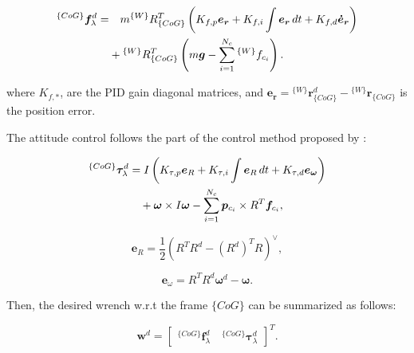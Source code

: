 \begin{align}
  {}^{\{CoG\}} \bm{f}_{\lambda}^{d} = 
  & \quad m {^{\{W\}}R_{\{CoG\}}^{T}} 
  \left( K_{f,p} \bm{e_r} + K_{f,i} \int \bm{e_r} \, dt + K_{f,d} \bm{\dot{e}_r} \right) \notag \\
  & + {^{\{W\}}R_{\{CoG\}}^{T}} 
  \left( m\bm{g} - \sum_{i=1}^{N_c} {^{\{W\}} f_{c_i}} \right).
  \end{align}

where $K_{f,*}$, are the PID gain diagonal matrices, and $\bm{e_r} = {}^{\{W\}}\bm{r}_{\{CoG\}}^{d} - {}^{\{W\}}\bm{r}_{\{CoG\}}$ is the position error.

The attitude control follows the part of the control method
proposed by \cite{lee2010geometric}:

\begin{align}
  ^{\{CoG\}} \bm{\tau}_{\lambda}^{d} &= I 
  \left( K_{\tau,p} \bm{e}_R + K_{\tau,i} \int \bm{e}_R \, dt + K_{\tau,d} \bm{e}_{\bm{\omega}} \right) \notag \\
  & \quad + \bm{\omega} \times I \bm{\omega} - \sum_{i=1}^{N_c} \bm{p}_{c_i} \times R^T \bm{f}_{c_i},
  \end{align}
  
  \begin{equation}
  \bm{e}_R = \frac{1}{2} \left( R^T R^d - (R^d)^T R \right)^{\vee},
  \end{equation}
  
  \begin{equation}
  \bm{e}_{\omega} = R^T R^d \bm{\omega}^d - \bm{\omega}.
  \end{equation}

  Then, the desired wrench w.r.t the frame $\{CoG\}$ can be summarized as follows:

\begin{equation}
\bm{w}^d = \begin{bmatrix} ^{\{CoG\}} \bm{f}_{\lambda}^{d} \quad ^{\{CoG\}} \bm{\tau}_{\lambda}^{d} \end{bmatrix}^T. 
\end{equation}
  